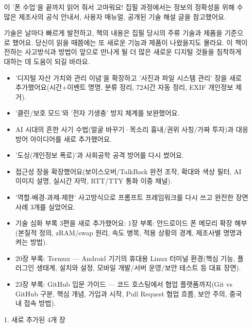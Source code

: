 
이 '폰 수업'을 끝까지 읽어 줘서 고마워요! 집필 과정에서는 정보의 정확성을 위해 수많은 제조사의 공식 안내서, 사용자 매뉴얼, 공개된 기술 해설 글을 참고했어요.

기술은 날마다 빠르게 발전하고, 책의 내용은 집필 당시의 주류 기술과 제품을 기준으로 했어요. 당신이 읽을 때쯤에는 또 새로운 기능과 제품이 나왔을지도 몰라요. 이 책이 전하는 사고방식과 방법이 앞으로 만나게 될 더 많은 새로운 디지털 것들을 침착하게 대하는 데 도움이 되길 바라요.


\begin{itemize}
  \item '디지털 자산 가치와 관리 이념'을 확장하고 '사진과 파일 시스템 관리' 장을 새로 추가했어요(시간+이벤트 명명, 분류 정리, 72시간 자동 정리, EXIF 개인정보 제거).
  \item '클린/보호 모드'와 '전자 기생충' 방지 체계를 보완했어요.
  \item AI 시대의 흔한 사기 수법(얼굴 바꾸기·목소리 흉내/권위 사칭/가짜 투자)과 대응 방어 아이디어를 새로 추가했어요.
  \item '도싱(개인정보 폭로)'과 사회공학 공격 방어를 다시 썼어요.
  \item 접근성 장을 확장했어요(보이스오버/TalkBack 완전 조작, 확대와 색상 필터, AI 이미지 설명, 실시간 자막, RTT/TTY 통화 이중 채널).
  \item '역할-배경-과제-제한' 사고방식으로 프롬프트 프레임워크를 다시 쓰고 완전한 장면 사례 3개를 실었어요.
  \item 기술 심화 부록 3편을 새로 추가했어요: 1장 부록: 안드로이드 폰 메모리 확장 해부(본질적 정의, zRAM/swap 원리, 속도 병목, 적용 상황의 경계, 제조사별 명명과 켜는 방법).
  \item 20장 부록: Termux — Android 기기의 휴대용 Linux 터미널 환경(핵심 기능, 플러그인 생태계, 설치와 설정, 모바일 개발/서버 운영/보안 테스트 등 대표 장면).
  \item 23장 부록: GitHub 입문 가이드 — 코드 호스팅에서 협업 플랫폼까지(Git vs GitHub 구분, 핵심 개념, 가입과 시작, Pull Request 협업 흐름, 보안 주의, 중국 내 접속 방법).
\end{itemize}


1. 새로 추가된 4개 장

